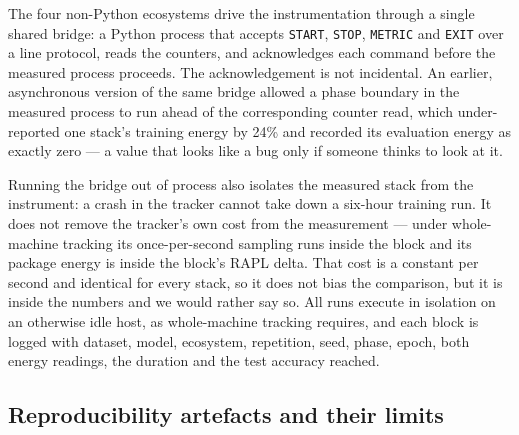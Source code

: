 The four non-Python ecosystems drive the instrumentation through a single shared
bridge: a Python process that accepts \texttt{START}, \texttt{STOP},
\texttt{METRIC} and \texttt{EXIT} over a line protocol, reads the counters, and
acknowledges each command before the measured process proceeds. The
acknowledgement is not incidental. An earlier, asynchronous version of the same
bridge allowed a phase boundary in the measured process to run ahead of the
corresponding counter read, which under-reported one stack's training energy by
24\% and recorded its evaluation energy as exactly zero --- a value that looks
like a bug only if someone thinks to look at it.

Running the bridge out of process also isolates the measured stack from the
instrument: a crash in the tracker cannot take down a six-hour training run. It
does not remove the tracker's own cost from the measurement --- under
whole-machine tracking its once-per-second sampling runs inside the block and
its package energy is inside the block's RAPL delta. That cost is a constant per
second and identical for every stack, so it does not bias the comparison, but it
is inside the numbers and we would rather say so. All runs execute in isolation on an otherwise idle
host, as whole-machine tracking requires, and each block is logged with dataset,
model, ecosystem, repetition, seed, phase, epoch, both energy readings, the
duration and the test accuracy reached.

\subsection{Reproducibility artefacts and their limits}
\label{app:repro}

